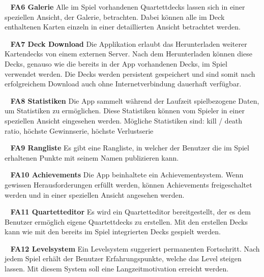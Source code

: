 \documentclass{scrartcl}
\begin{document}
\ \newline
\textbf{FA6 Galerie} \newline
Alle im Spiel vorhandenen Quartettdecks lassen sich in einer speziellen Ansicht,
der Galerie, betrachten. Dabei können alle im Deck enthaltenen Karten einzeln
in einer detaillierten Ansicht betrachtet werden.

\ \newline
\textbf{FA7 Deck Download} \newline
Die Applikation erlaubt das Herunterladen weiterer Kartendecks von einem
externen Server. Nach dem Herunterladen können diese Decks, genauso wie die
bereits in der App vorhandenen Decks, im Spiel verwendet werden. Die Decks werden
persistent gespeichert und sind somit nach erfolgreichem Download auch ohne
Internetverbindung dauerhaft verfügbar.

\ \newline
\textbf{FA8 Statistiken} \newline
Die App sammelt während der Laufzeit spielbezogene Daten, um Statistiken zu
ermöglichen. Diese Statistiken können vom Spieler in einer speziellen Ansicht
eingesehen werden. Mögliche Statistiken sind: kill / death ratio, höchste
Gewinnserie, höchste Verlustserie

\ \newline
\textbf{FA9 Rangliste} \newline
Es gibt eine Rangliste, in welcher der Benutzer die im Spiel erhaltenen Punkte
mit seinem Namen publizieren kann.

\ \newline
\textbf{FA10 Achievements} \newline
Die App beinhaltete ein Achievementsystem. Wenn gewissen Herausforderungen
erfüllt werden, können Achievements freigeschaltet werden und in einer
speziellen Ansicht angesehen werden.

\ \newline
\textbf{FA11 Quartetteditor} \newline
Es wird ein Quartetteditor bereitgestellt, der es dem Benutzer ermöglich
eigene Quartettdecks zu erstellen. Mit den erstellen Decks kann wie mit den
bereits im Spiel integrierten Decks gespielt werden.

\ \newline
\textbf{FA12 Levelsystem} \newline
Ein Levelsystem suggeriert permanenten Fortschritt. Nach jedem Spiel erhält der
Benutzer Erfahrungspunkte, welche das Level steigen lassen. Mit diesem System
soll eine Langzeitmotivation erreicht werden.
\end{document}
